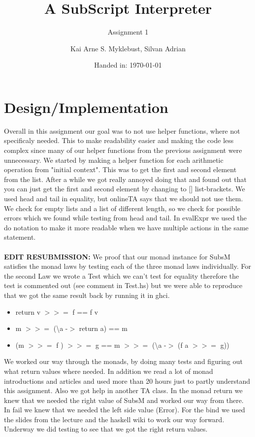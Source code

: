 \documentclass[12pt,a4paper]{article}
\begin{document}
\title{A SubScript Interpreter}
\subtitle{Assignment 1}

\author{Kai Arne S. Myklebust, Silvan Adrian}
\date{Handed in: \today}
	
\maketitle
\tableofcontents

\section{Design/Implementation}

Overall in this assignment our goal was to not use helper functions, where not specificaly needed. This to make readability easier and making the code less complex since many of our helper functions from the previous assignment were unnecessary.
We started by making a helper function for each arithmetic operation from "initial context". This was to get the first and second element from the list. After a while we got really annoyed doing that and found out that you can just get the first and second element by changing to [] list-brackets.
We used head and tail in equality, but onlineTA says that we should not use them. We check for empty lists and a list of different length, so we check for possible errors which we found while testing from head and tail.
In evalExpr we used the do notation to make it more readable when we have multiple actions in the same statement.\\\\
\textbf{EDIT RESUBMISSION:}
We proof that our monad instance for SubsM satisfies the monad laws by testing each of the three monad laws individually.
For the second Law we wrote a Test which we can't test for equality therefore the test is commented out (see comment in Test.hs) but we were able to reproduce that we got the same result back by running it in ghci.
\begin{itemize}
	\item return v $>>=$ f == f v
	\item m $>>=$ (\textbackslash a -$>$ return a) == m
	\item (m $>>=$ f ) $>>=$ g == m $>>=$ (\textbackslash a -$>$ (f a $>>=$ g))
\end{itemize}

We worked our way through the monads, by doing many tests and figuring out what return values where needed. In addition we read a lot of monad introductions and articles and used more than 20 hours just to partly understand this assignment. Also we got help in another TA class.
In the monad return we knew that we needed the right value of SubsM and worked our way from there. In fail we knew that we needed the left side value (Error).
For the bind we used the slides from the lecture and the haskell wiki to work our way forward. Underway we did testing to see that we got the right return values.
\end{document}

